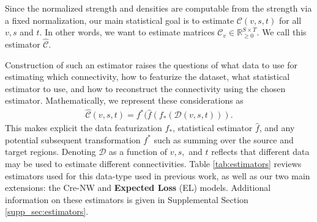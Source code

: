 Since the normalized strength and densities are computable from the strength via a fixed normalization, our main statistical goal is to estimate $\mathcal C (v,s,t) $ for all $v, s$ and $t$.%
In other words, we want to estimate matrices $\mathcal C_v \in \mathbb R_{\geq 0}^{S \times T}$.
We call this estimator $\widehat { \mathcal C } $.

Construction of such an estimator raises the questions of what data to use for estimating which connectivity, how to featurize the dataset, what statistical estimator to use, and how to reconstruct the connectivity using the chosen estimator.
Mathematically, we represent these considerations as 
\begin{align}
\label{eq:estimator}
\widehat { \mathcal C }(v,s,t) = f^* (\widehat f (f_*( \mathcal D(v,s,t))).
\end{align}
This makes explicit the data featurization $f_{*}$, statistical estimator $\widehat f$, and any potential subsequent transformation $f^*$ such as summing over the source and target regions.
Denoting $ \mathcal D$ as a function of $v,s,$ and $t$ reflects that different data may be used to estimate different connectivities.
Table \ref{tab:estimators} reviews estimators used for this data-type used in previous work, as well as our two main extensions: the Cre-NW and \textbf{Expected Loss} (EL) models.
Additional information on these estimators is given in Supplemental Section \ref{supp_sec:estimators}.

